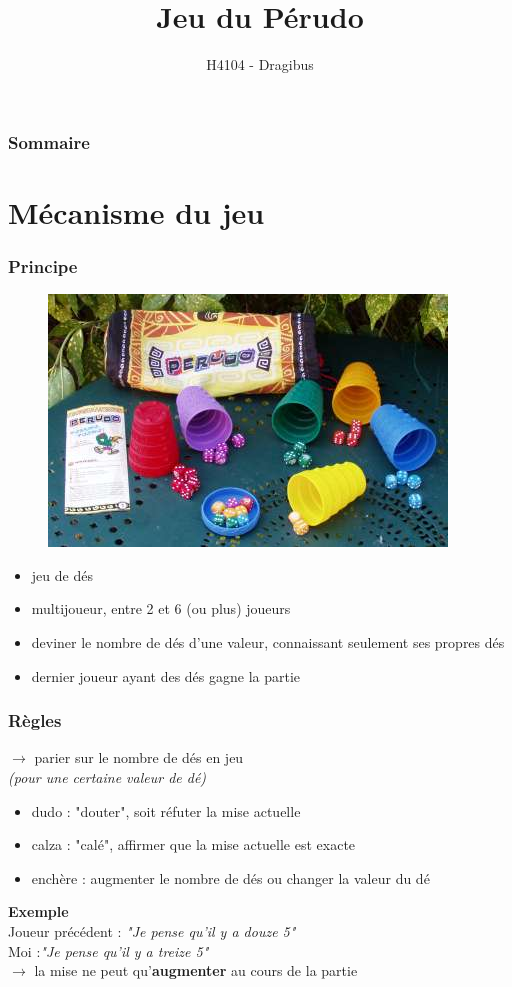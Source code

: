 \documentclass{beamer}
\title{Jeu du Pérudo}
\author{H4104 - Dragibus}
\institute{INSA de Lyon}
\begin{document}
\begin{frame}
  \titlepage
\end{frame}

\begin{frame}
  \frametitle{Sommaire}
  \tableofcontents[hideallsubsections]
\end{frame}

\section{Mécanisme du jeu}

\begin{frame}
  \frametitle{Principe}

  \begin{figure}
    \includegraphics[scale=0.4]{perudo}
  \end{figure}

  \begin{itemize}
    \item jeu de dés
    \item multijoueur, entre 2 et 6 (ou plus) joueurs
    \item deviner le nombre de dés d'une valeur, connaissant seulement ses
      propres dés
    \item dernier joueur ayant des dés gagne la partie
  \end{itemize}
\end{frame}

\begin{frame}
  \frametitle{Règles}
  $\to$ parier sur le nombre de dés en jeu \\
  \emph{(pour une certaine valeur de dé)}

  \begin{itemize}
    \item dudo : "douter", soit réfuter la mise actuelle
    \item calza : "calé", affirmer que la mise actuelle est exacte
    \item enchère : augmenter le nombre de dés ou changer la valeur du dé
  \end{itemize}

  \textbf{Exemple}
  \\
  Joueur précédent : \textit{"Je pense qu'il y a douze 5"}
  \\
  Moi :\textit{"Je pense qu'il y a treize 5"}
  \\[5mm]
  $\to$ la mise ne peut qu'\textbf{augmenter} au cours de la partie
\end{frame}
\end{document}
